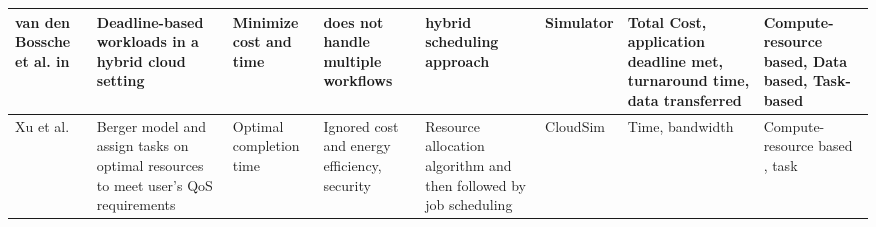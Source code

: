 \begin{table*}[!htbp]
{\begin{tabular}{|p{1.9cm} p{2cm} p{2cm} p{2cm} p{2cm} p{2cm} p{2cm} p{2cm}|}
van den Bossche et al. in~\cite{van2013online} & Deadline-based workloads in a hybrid cloud setting & Minimize cost and time & does not handle multiple workflows & hybrid scheduling approach & Simulator & Total Cost, application deadline met, turnaround time, data transferred & Compute-resource based, Data based, Task-based
\\ \hline

Xu et al.~\cite{xu2011job} & Berger model and assign tasks on optimal resources to meet user's QoS requirements & Optimal completion time & Ignored cost and energy efficiency, security& Resource allocation algorithm and then followed by job scheduling & CloudSim & Time, bandwidth & Compute-resource based , task
\\ \hline


\end{tabular}
}
\end{table*}